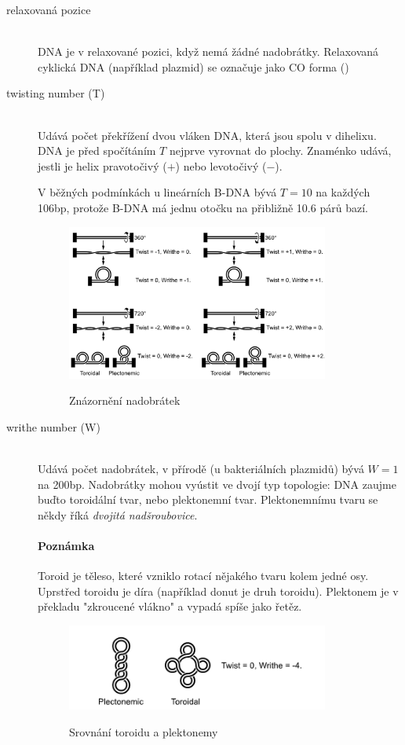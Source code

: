 \documentclass[DIV=8]{scrreprt}
\newcommand{\mybox}[2]{
    \paragraph{#1} #2
}
\begin{document}
\begin{description}
\item[relaxovaná pozice]\hfill \\
DNA je v relaxované pozici, když nemá žádné nadobrátky. Relaxovaná cyklická DNA (například plazmid) se označuje jako CO forma ()


\item[twisting number (T)]\hfill \\
Udává počet překřížení dvou vláken DNA, která jsou spolu v dihelixu. DNA je před spočítáním \(T\) nejprve vyrovnat do plochy. Znaménko udává, jestli je helix pravotočivý (\(+\)) nebo levotočivý (\(-\)).

V běžných podmínkách u lineárních B-DNA bývá \(T = 10\) na každých 106bp, protože B-DNA má jednu otočku na přibližně 10.6 párů bazí. \begin{figure}
    \caption{Znázornění nadobrátek}
    \includegraphics[width=0.85\textwidth]{twist_and_writhe.png}
    \centering
    \label{}
\end{figure}



\item[writhe number (W)]\hfill \\
Udává počet nadobrátek, v přírodě (u bakteriálních plazmidů) bývá \(W = 1\) na 200bp. Nadobrátky mohou vyústit ve dvojí typ topologie: DNA zaujme buďto toroidální tvar, nebo plektonemní tvar. Plektonemnímu tvaru se někdy říká \emph{dvojitá nadšroubovice}.

\mybox{Poznámka}{Toroid je těleso, které vzniklo rotací nějakého tvaru kolem jedné osy. Uprstřed toroidu je díra (například donut je druh toroidu). Plektonem je v překladu "zkroucené vlákno" a vypadá spíše jako řetěz.}


\begin{figure}
    \caption{Srovnání toroidu a plektonemy}
    \includegraphics[width=0.85\textwidth]{toroid_plectoneme.png}
    \centering
    \label{}
\end{figure}



\end{description}
\end{document}
